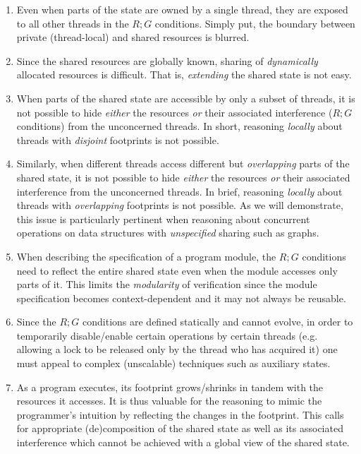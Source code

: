 \begin{enumerate}%
	\item Even when parts of the state are owned by a single thread, they are exposed to all other threads in the $R;G$ conditions. Simply put, the boundary between private (thread-local) and shared resources is blurred.
	
	\item Since the shared resources are globally known, sharing of \emph{dynamically} allocated resources is difficult. That is, \emph{extending} the shared state is not easy.
	
	\item When parts of the shared state are accessible by only a subset of threads, it is not possible to hide \emph{either} the resources \emph{or} their associated interference ($R;G$ conditions) from the unconcerned threads. In short, reasoning \emph{locally} about threads with \emph{disjoint} footprints is not possible.
	
	\item Similarly, when different threads access different but \emph{overlapping} parts of the shared state, it is not possible to hide \emph{either} the resources \emph{or} their associated interference from the unconcerned threads. In brief, reasoning \emph{locally} about threads with \emph{overlapping} footprints is not possible. As we will demonstrate, this issue is particularly pertinent when reasoning about concurrent operations on data structures with \emph{unspecified} sharing such as graphs. 
	
	\item When describing the specification of a program module, the $R;G$ conditions need to reflect the entire shared state even when the module accesses only parts of it. This limits the \emph{modularity} of verification since the module specification becomes context-dependent and it may not always be reusable.
	
	\item Since the $R;G$ conditions are defined statically and cannot evolve, in order to temporarily disable/enable certain operations by certain threads (e.g. allowing a lock to be released only by the thread who has acquired it) one must appeal to complex (unscalable) techniques such as auxiliary states. 
	
	\item As a program executes, its footprint grows/shrinks in tandem with the resources it accesses. It is thus valuable for the reasoning to mimic the programmer's intuition by reflecting the changes in the footprint. This calls for appropriate (de)composition of the shared state as well as its associated interference which cannot be achieved with a global view of the shared state. \vspace{-5pt}
\end{enumerate}
